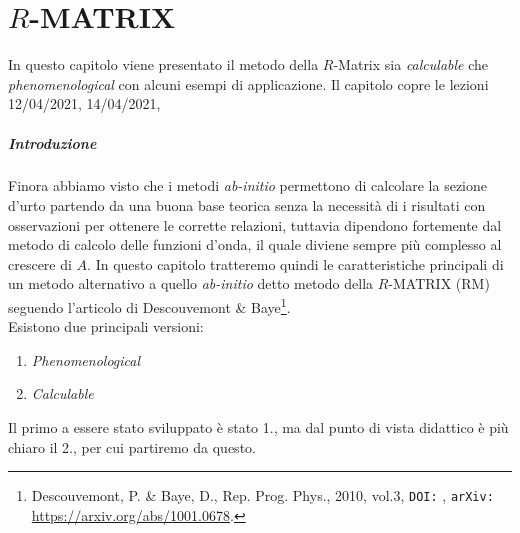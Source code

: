 \chapter{$R$-MATRIX}\label{sec-R-mat}
In questo capitolo viene presentato il metodo della $R$-Matrix sia \textit{calculable} che \textit{phenomenological} con alcuni esempi di applicazione. Il capitolo copre le lezioni 12/04/2021, 14/04/2021, 

\paragraph{Introduzione} Finora abbiamo visto che i metodi \textit{ab-initio} permettono di calcolare la sezione d'urto partendo da una buona base teorica senza la necessità di  i risultati con osservazioni per ottenere le corrette relazioni, tuttavia dipendono fortemente dal metodo di calcolo delle funzioni d'onda, il quale diviene sempre più complesso al crescere di $A$. In questo capitolo tratteremo quindi le caratteristiche principali di un metodo alternativo a quello \textit{ab-initio} detto metodo della $R$-MATRIX (RM) seguendo l'articolo di Descouvemont \& Baye\footnote{\label{0412_art} Descouvemont, P. \& Baye, D., Rep. Prog. Phys., 2010, vol.3, \texttt{DOI:} , \texttt{arXiv:} \url{https://arxiv.org/abs/1001.0678}.}.\\ 
Esistono due principali versioni:
\begin{enumerate}
	\item \textit{Phenomenological}
	\item \textit{Calculable}
\end{enumerate}
Il primo a essere stato sviluppato è stato 1., ma dal punto di vista didattico è più chiaro il 2., per cui partiremo da questo.

